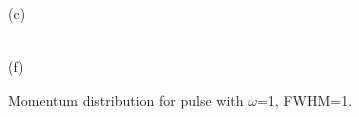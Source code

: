 \begin{figure}[h!]
\begin{minipage}[h]{0.43\linewidth}
\end{minipage}
\begin{minipage}[h]{0.43\linewidth}
 (c) \\
\end{minipage}
\hfill
\begin{minipage}[h]{0.43\linewidth}
 \\(f)
\end{minipage}
\caption{Momentum distribution for pulse with $\omega$=1, FWHM=1.}
\label{fig:md_2}
\end{figure}

